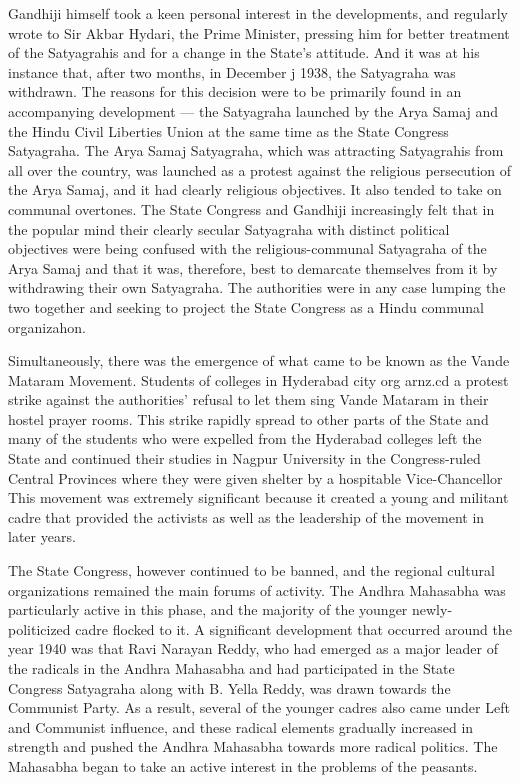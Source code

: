 \begin{multicols}{2}
Gandhiji himself took a keen personal interest in the developments, and regularly wrote to Sir Akbar Hydari, the Prime Minister, pressing him for better treatment of the Satyagrahis and for a change in the State's attitude. And it was at his instance that, after two months, in December j 1938, the Satyagraha was withdrawn. The reasons for this decision were to be primarily found in an accompanying development --- the Satyagraha launched by the Arya Samaj and the Hindu Civil Liberties Union at the same time as the State Congress Satyagraha. The Arya Samaj Satyagraha, which was attracting Satyagrahis from all over the country, was launched as a protest against the religious persecution of the Arya Samaj, and it had clearly religious objectives. It also tended to take on communal overtones. The State Congress and Gandhiji increasingly felt that in the popular mind their clearly secular Satyagraha with distinct political objectives were being confused with the religious-communal Satyagraha of the Arya Samaj and that it was, therefore, best to demarcate themselves from it by withdrawing their own Satyagraha. The authorities were in any case lumping the two together and seeking to project the State Congress as a Hindu communal organizahon. 

Simultaneously, there was the emergence of what came to be known as the Vande Mataram Movement. Students of colleges in Hyderabad city org arnz.cd a protest strike against the authorities' refusal to let them sing Vande Mataram in their hostel prayer rooms. This strike rapidly spread to other parts of the State and many of the students who were expelled from the Hyderabad colleges left the State and continued their studies in Nagpur University in the Congress-ruled Central Provinces where they were given shelter by a hospitable Vice-Chancellor This movement was extremely significant because it created a young and militant cadre that provided the activists as well as the leadership of the movement in later years. 

The State Congress, however continued to be banned, and the regional cultural organizations remained the main forums of activity. The Andhra Mahasabha was particularly active in this phase, and the majority of the younger newly-politicized cadre flocked to it. A significant development that occurred around the year 1940 was that Ravi Narayan Reddy, who had emerged as a major leader of the radicals in the Andhra Mahasabha and had participated in the State Congress Satyagraha along with B. Yella Reddy, was drawn towards the Communist Party. As a result, several of the younger cadres also came under Left and Communist influence, and these radical elements gradually increased in strength and pushed the Andhra Mahasabha towards more radical politics. The Mahasabha began to take an active interest in the problems of the peasants. 


\end{multicols}
